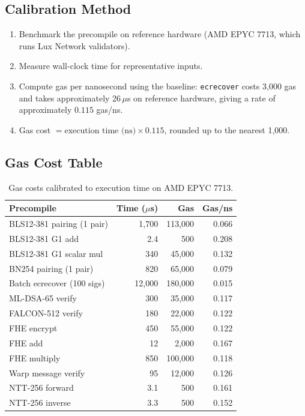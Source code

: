 \documentclass[11pt,a4paper]{article}
\begin{document}
\subsection{Calibration Method}

\begin{enumerate}[nosep]
  \item Benchmark the precompile on reference hardware (AMD EPYC 7713, which runs Lux
    Network validators).
  \item Measure wall-clock time for representative inputs.
  \item Compute gas per nanosecond using the baseline: \texttt{ecrecover} costs 3,000 gas
    and takes approximately 26\,$\mu$s on reference hardware, giving a rate of approximately
    $0.115$ gas/ns.
  \item Gas cost $= \text{execution time (ns)} \times 0.115$, rounded up to the nearest
    1,000.
\end{enumerate}

\subsection{Gas Cost Table}

\begin{table}[H]
\centering
\small
\begin{tabular}{@{}lrrr@{}}
\toprule
\textbf{Precompile} & \textbf{Time ($\mu$s)} & \textbf{Gas} & \textbf{Gas/ns} \\
\midrule
BLS12-381 pairing (1 pair) & 1,700 & 113,000 & 0.066 \\
BLS12-381 G1 add & 2.4 & 500 & 0.208 \\
BLS12-381 G1 scalar mul & 340 & 45,000 & 0.132 \\
BN254 pairing (1 pair) & 820 & 65,000 & 0.079 \\
Batch ecrecover (100 sigs) & 12,000 & 180,000 & 0.015 \\
ML-DSA-65 verify & 300 & 35,000 & 0.117 \\
FALCON-512 verify & 180 & 22,000 & 0.122 \\
FHE encrypt & 450 & 55,000 & 0.122 \\
FHE add & 12 & 2,000 & 0.167 \\
FHE multiply & 850 & 100,000 & 0.118 \\
Warp message verify & 95 & 12,000 & 0.126 \\
NTT-256 forward & 3.1 & 500 & 0.161 \\
NTT-256 inverse & 3.3 & 500 & 0.152 \\
\bottomrule
\end{tabular}
\caption{Gas costs calibrated to execution time on AMD EPYC 7713.}
\end{table}
\end{document}
